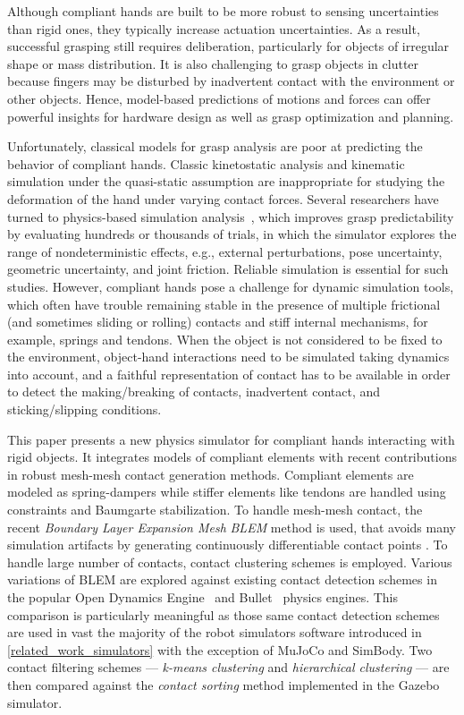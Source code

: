 Although compliant hands are built to be more robust to sensing uncertainties than rigid ones, they typically increase actuation uncertainties. As a result, successful grasping still requires deliberation, particularly for objects of irregular shape or mass distribution. It is also challenging to grasp objects in clutter because fingers may be disturbed by inadvertent contact with the environment or other objects. Hence, model-based predictions of motions and forces can offer powerful insights for hardware design as well as grasp optimization and planning.

Unfortunately, classical models for grasp analysis are poor at predicting the behavior of compliant hands. Classic kinetostatic analysis and kinematic simulation under the quasi-static assumption are inappropriate for studying the deformation of the hand under varying contact forces.  Several researchers have turned to physics-based simulation analysis~\cite{Kappler15, JunggonKim13}, which improves grasp predictability by evaluating hundreds or thousands of trials, in which the simulator explores the range of nondeterministic effects, e.g., external perturbations, pose uncertainty, geometric uncertainty, and joint friction. Reliable simulation is essential for such studies. However, compliant hands pose a challenge for dynamic simulation tools, which often have trouble remaining stable in the presence of multiple frictional (and sometimes sliding or rolling) contacts and stiff internal mechanisms, for example, springs and tendons. When the object is not considered to be fixed to the environment, object-hand interactions need to be simulated taking dynamics into account, and a faithful representation of contact has to be available in order to detect the making/breaking of contacts, inadvertent contact, and sticking/slipping conditions. 

This paper presents a new physics simulator for compliant hands interacting with rigid objects. It integrates models of compliant elements with recent contributions in robust mesh-mesh contact generation methods.  Compliant elements are modeled as spring-dampers while stiffer elements like tendons are handled using constraints and Baumgarte stabilization.  To handle mesh-mesh contact, the recent \emph{Boundary Layer Expansion Mesh} \emph{BLEM} method is used, that avoids many simulation artifacts by generating continuously differentiable contact points \cite{Hauser13BLEM}. To handle large number of contacts, contact clustering schemes is employed. Various variations of BLEM are explored against existing contact detection schemes in the popular {Open Dynamics Engine}~\cite{opende} and Bullet~\cite{bulletpe} physics engines. This comparison is particularly meaningful as those same contact detection schemes are used in vast the majority of the robot simulators software introduced in \ref{related_work_simulators} with the exception of MuJoCo and SimBody. Two contact filtering schemes ---  \emph{k-means clustering} and \emph{hierarchical clustering} --- are then compared against the \emph{contact sorting} method implemented in the Gazebo simulator.

